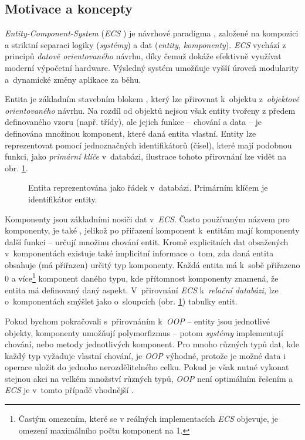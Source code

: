\subsection{Motivace a koncepty}

\emph{Entity-Component-System} (\emph{ECS} \cite{WhatIsECS, UnderstandingECS}) je návrhové paradigma \cite{EntitySystemsFuture}, založené na kompozici a striktní separaci logiky (\emph{systémy}) a dat (\emph{entity}, \emph{komponenty}). \emph{ECS} vychází z principů \emph{datově orientovaného} návrhu, díky čemuž dokáže efektivně využívat moderní výpočetní hardware. Výsledný systém umožňuje vyšší úroveň modularity a~dynamické změny aplikace za běhu.

Entita je základním stavebním blokem \cite{EntitySystemsFuture}, který lze přirovnat k~objektu z~\emph{objektově orientovaného} návrhu. Na rozdíl od objektů nejsou však entity tvořeny z předem definovaného vzoru (např. třídy), ale jejich funkce -- chování a data -- je definována množinou komponent, které daná entita vlastní. Entity lze reprezentovat pomocí jednoznačných identifikátorů (čísel), které mají podobnou funkci, jako \emph{primární klíče} v~databázi, ilustrace tohoto přirovnání lze vidět na obr. \ref{Fig:ECSDB}.

\begin{figure}[H]
	\centering
	\caption{Entita reprezentována jako řádek v~databázi. Primárním klíčem je identifikátor entity.}
	\label{Fig:ECSDB}
\end{figure}

Komponenty jsou základními nosiči dat v~\emph{ECS}. Často používaným názvem pro komponenty, je také  \cite{EntitySystemsFuture}, jelikož po přiřazení komponent k~entitám mají komponenty další funkci -- určují množinu chování entit. Kromě explicitních dat obsažených v~komponentách existuje také implicitní informace o~tom, zda daná entita obsahuje (má přiřazen) určitý typ komponenty. Každá entita má k~sobě přiřazeno 0 a více\footnote{Častým omezením, které se v reálných implementacích \emph{ECS} objevuje, je omezení maximálního počtu komponent na 1.} komponent daného typu, kde přítomnost komponenty znamená, že entita má definovaný daný aspekt. V~přirovnání \emph{ECS} k~\emph{relační databázi}, lze o~komponentách smýšlet jako o~sloupcích (obr. \ref{Fig:ECSDB}) tabulky entit.

Pokud bychom pokračovali s~přirovnáním k~\emph{OOP} -- entity jsou jednotlivé objekty, komponenty umožňují polymorfizmus -- potom \emph{systémy} implementují chování, nebo metody jednotlivých komponent. Pro mnoho různých typů dat, kde každý typ vyžaduje vlastní chování, je \emph{OOP} výhodné, protože je možné data i operace uložit do jednoho nerozdělitelného celku. Pokud je však nutné vykonat stejnou akci na velkém množství různých typů, \emph{OOP} není optimálním řešením a \emph{ECS} je v~tomto případě vhodnější \cite{EntitySystemsFuture}. 

